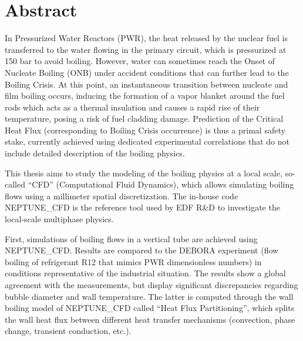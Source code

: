 


\begingroup
\let\clearpage\relax
\let\cleardoublepage\relax
\let\cleardoublepage\relax

\chapter*{Abstract}

In Pressurized Water Reactors (PWR), the heat released by the nuclear fuel is transferred to the water flowing in the primary circuit, which is pressurized at 150 bar to avoid boiling. However, water can sometimes reach the Onset of Nucleate Boiling (ONB) under accident conditions that can further lead to the Boiling Crisis. At this point, an instantaneous transition between nucleate and film boiling occurs, inducing the formation of a vapor blanket around the fuel rods which acts as a thermal insulation and  causes a rapid rise of their temperature, posing a risk of fuel cladding damage. Prediction of the Critical Heat Flux (corresponding to Boiling Crisis occurrence) is thus a primal safety stake, currently achieved using dedicated experimental correlations that do not include detailed description of the boiling physics.

\npar

This thesis aims to study the modeling of the boiling physics at a local scale, so-called  “CFD” (Computational Fluid Dynamics), which allows simulating boiling flows using a millimeter spatial discretization. The in-house code NEPTUNE\_CFD is the reference tool used by EDF R\&D to investigate the local-scale multiphase physics.

\npar

First, simulations of boiling flows in a vertical tube are achieved using NEPTUNE\_CFD. Results are compared to the DEBORA experiment (flow boiling of refrigerant R12 that mimics PWR dimensionless numbers) in conditions representative of the industrial situation. The results show a global agreement with the measurements, but display significant discrepancies regarding bubble diameter and wall temperature. The latter is computed through the wall boiling model of NEPTUNE\_CFD called “Heat Flux Partitioning”, which splits the wall heat flux between different heat transfer mechanisms (convection, phase change, transient conduction, etc.).

